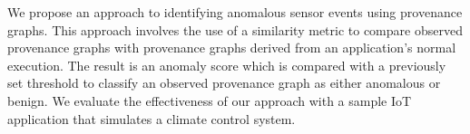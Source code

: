  
 
 \par We propose an approach to identifying anomalous sensor events using provenance graphs. This approach involves the use of a similarity metric to compare observed provenance graphs with provenance graphs derived from an application's normal execution. The result is an anomaly score which is  compared with a previously set threshold to classify an observed provenance graph as either anomalous or benign. We evaluate the effectiveness of our approach with a sample IoT application that simulates a climate control system.




